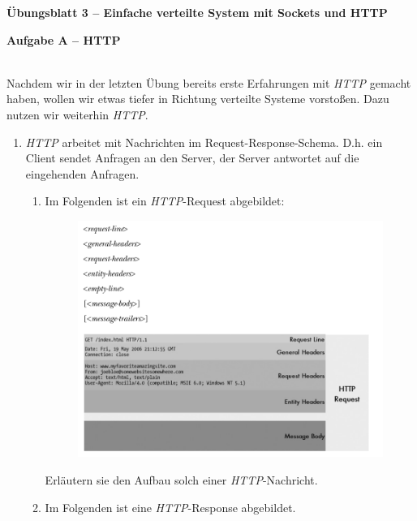 \documentclass[paper=a4,fontsize=11pt]{scrartcl}%
\numberwithin{equation}{section}
\begin{document}
\begin{center}
\Large{\textbf{Übungsblatt 3 -- Einfache verteilte System mit Sockets und HTTP}}
\end{center}

\begin{center}\Large{\textbf{Aufgabe A -- HTTP}}\end{center}
~\\
Nachdem wir in der letzten Übung bereits erste Erfahrungen mit \emph{HTTP} gemacht haben, wollen wir etwas tiefer in Richtung verteilte Systeme vorstoßen. Dazu nutzen wir weiterhin \emph{HTTP}.
\begin{enumerate}
	\item \emph{HTTP} arbeitet mit Nachrichten im Request-Response-Schema. D.h. ein Client sendet Anfragen an den Server, der Server antwortet auf die eingehenden Anfragen.
	\begin{enumerate}
		\item Im Folgenden ist ein \emph{HTTP}-Request abgebildet:
		\begin{figure}[H]
	\includegraphics[scale=0.4]{http_req}
	\end{figure}
	Erläutern sie den Aufbau solch einer \emph{HTTP}-Nachricht.
	\item Im Folgenden ist eine \emph{HTTP}-Response abgebildet.
	\begin{figure}[H]

\end{figure}
\end{enumerate}
\end{enumerate}
\end{document}
